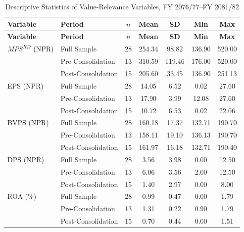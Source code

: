 {\small
\begin{longtable}{llccccc}
\caption[Descriptive Statistics of Value-Relevance Variables]{Descriptive Statistics of Value-Relevance Variables, FY 2076/77--FY 2081/82}
\label{tab:t1_descriptives}\\
\toprule
\textbf{Variable} & \textbf{Period} & \textbf{$n$} & \textbf{Mean} & \textbf{SD} & \textbf{Min} & \textbf{Max} \\
\midrule
\endfirsthead
\textbf{Variable} & \textbf{Period} & \textbf{$n$} & \textbf{Mean} & \textbf{SD} & \textbf{Min} & \textbf{Max} \\
\midrule
\endhead
$\mathit{MPS}^{RD}$ (NPR) & Full Sample & 28 & 254.34 & 98.82 & 136.90 & 520.00 \\
 & Pre-Consolidation & 13 & 310.59 & 119.46 & 176.00 & 520.00 \\
 & Post-Consolidation & 15 & 205.60 & 33.45 & 136.90 & 251.13 \\
\midrule
EPS (NPR) & Full Sample & 28 & 14.05 & 6.52 & 0.02 & 27.60 \\
 & Pre-Consolidation & 13 & 17.90 & 3.99 & 12.08 & 27.60 \\
 & Post-Consolidation & 15 & 10.72 & 6.53 & 0.02 & 22.06 \\
\midrule
BVPS (NPR) & Full Sample & 28 & 160.18 & 17.37 & 132.71 & 190.70 \\
 & Pre-Consolidation & 13 & 158.11 & 19.10 & 136.13 & 190.70 \\
 & Post-Consolidation & 15 & 161.97 & 16.18 & 132.71 & 190.40 \\
\midrule
DPS (NPR) & Full Sample & 28 & 3.56 & 3.98 & 0.00 & 12.50 \\
 & Pre-Consolidation & 13 & 6.06 & 3.56 & 2.00 & 12.50 \\
 & Post-Consolidation & 15 & 1.40 & 2.97 & 0.00 & 8.00 \\
\midrule
ROA (\%) & Full Sample & 28 & 0.99 & 0.47 & 0.00 & 1.79 \\
 & Pre-Consolidation & 13 & 1.31 & 0.22 & 0.90 & 1.79 \\
 & Post-Consolidation & 15 & 0.70 & 0.44 & 0.00 & 1.51 \\
\bottomrule
\end{longtable}}

